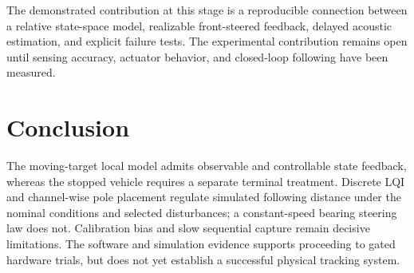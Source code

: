 The demonstrated contribution at this stage is a reproducible connection between a relative state-space model, realizable front-steered feedback, delayed acoustic estimation, and explicit failure tests. The experimental contribution remains open until sensing accuracy, actuator behavior, and closed-loop following have been measured.


\section{Conclusion}
The moving-target local model admits observable and controllable state feedback, whereas the stopped vehicle requires a separate terminal treatment. Discrete LQI and channel-wise pole placement regulate simulated following distance under the nominal conditions and selected disturbances; a constant-speed bearing steering law does not. Calibration bias and slow sequential capture remain decisive limitations. The software and simulation evidence supports proceeding to gated hardware trials, but does not yet establish a successful physical tracking system.

